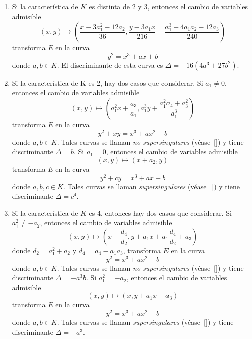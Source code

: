 \begin{enumerate}
	\item Si la característica de $K$ es distinta de $2$ y $3$, entonces el cambio de variables admisible
	$$
	(x, y) \mapsto \left(\frac{x - 3 a_1^2 - 12 a_2}{36}, \frac{y - 3 a_1 x}{216} - \frac{a_1^3 + 4 a_1 a_2 - 12 a_3}{240}\right)
	$$
	transforma $E$ en la curva
	\begin{equation*}\label{eq:ecuación Weierstrass}
		y^2 = x^3 + a x + b
	\end{equation*}
	donde $a, b \in K$. El discriminante de esta curva es $\Delta = -16(4a^3 + 27b^2)$.

	\item Si la característica de K es 2, hay dos casos que considerar. Si $a_1 \neq 0$, entonces el cambio de variables admisible
	$$
	(x, y) \mapsto \left(a_1^2 x + \frac{a_3}{a_1}, a_1^3 y + \frac{a_1^2 a_4 + a_3^2}{a_1^3} \right)
	$$
	transforma $E$ en la curva
	\begin{equation*}
		y^2 + xy = x^3 + a x^2 + b
	\end{equation*}
	donde $a, b \in K$. Tales curvas se llaman \emph{no supersingulares} (véase~\ref{}) y tiene discriminante $\Delta = b$. Si $a_1 = 0$, entonces el cambio de variables admisible
	$$
	(x, y) \mapsto (x + a_2, y)
	$$
	transforma $E$ en la curva
	\begin{equation*}
		y^2 + c y = x^3 + a x + b
	\end{equation*}
	donde $a, b, c \in K$. Tales curvas se llaman \emph{supersingulares} (véase~\ref{}) y tiene discriminante $\Delta = c^4$.

	\item Si la característica de $K$ es 4, entonces hay dos casos que considerar. Si $a_1^2 \neq -a_2$, entonces el cambio de variables admisible
	$$
	(x, y) \mapsto \left(x + \frac{d_4}{d_2}, y + a_1 x + a_1 \frac{d_4}{d_2} + a_3 \right)
	$$
	donde $d_2 = a_1^2 + a_2$ y $d_4 = a_4 - a_1 a_3$, transforma $E$ en la curva
	\begin{equation*}
		y^2 = x^3 + a x^2 + b
	\end{equation*}
	donde $a, b \in K$. Tales curvas se llaman \emph{no supersingulares} (véase~\ref{}) y tiene discriminante $\Delta = -a^3 b$. Si $a_1^2 = -a_2$, entonces el cambio de variables admisible
	$$
	(x, y) \mapsto (x, y + a_1 x + a_3)
	$$
	transforma $E$ en la curva
	\begin{equation*}
		y^2 = x^3 + a x^2 + b
	\end{equation*}
	donde $a, b \in K$. Tales curvas se llaman \emph{supersingulares} (véase~\ref{}) y tiene discriminante $\Delta = -a^3$.
\end{enumerate}
